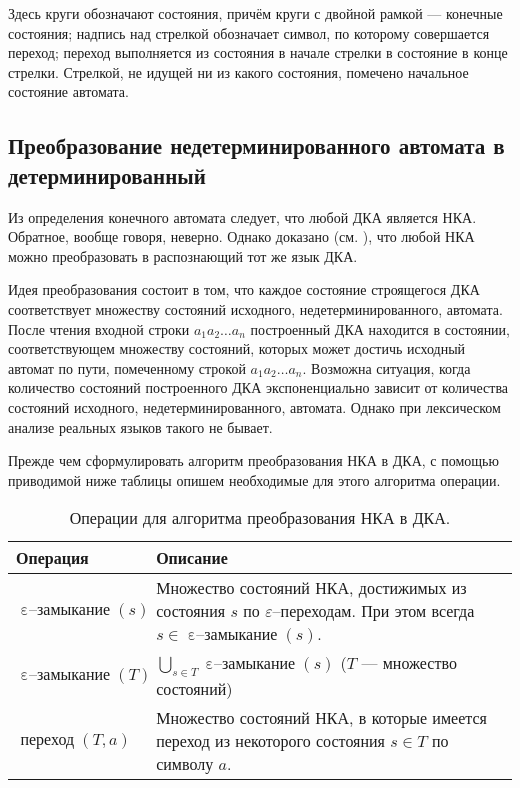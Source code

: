 \documentclass[10pt]{report}
\newcommand{\epsclos}{\mathop{\text{$\varepsilon$--замыкание}}}
\newcommand{\move}{\mathop{\text{переход}}}
\begin{document}
Здесь круги обозначают состояния, причём круги с двойной рамкой --- конечные состояния; надпись над стрелкой обозначает символ, по которому совершается переход;
переход выполняется из состояния в начале стрелки в состояние в конце стрелки. Стрелкой, не идущей ни из какого состояния, помечено начальное состояние автомата.

\subsection{Преобразование недетерминированного автомата в детерминированный}
Из определения конечного автомата следует, что любой ДКА является НКА. Обратное, вообще говоря, неверно. Однако доказано (см. \cite{AhoLamSetiUllman,HopkroftMotvaniUllman}),
что любой НКА можно преобразовать в распознающий тот же язык ДКА.

Идея преобразования состоит в том, что каждое состояние строящегося ДКА соответствует множеству состояний исходного, недетерминированного, автомата. После чтения входной
строки $a_1a_2\dots a_n$ построенный ДКА находится в состоянии, соответствующем множеству состояний, которых может достичь исходный автомат по пути, помеченному строкой
$a_1a_2\dots a_n$. Возможна ситуация, когда количество состояний построенного ДКА экспоненциально зависит от количества состояний исходного, недетерминированного, автомата.
Однако при лексическом анализе реальных языков такого не бывает.

Прежде чем сформулировать алгоритм преобразования НКА в ДКА, с помощью приводимой ниже таблицы опишем необходимые для этого алгоритма операции.
\begin{table}[!h]
\centering
\caption{Операции для алгоритма преобразования НКА в ДКА.}\label{Ops.for.conversion!table}
\vspace{1mm}
\begin{tabular}{|l|p{108mm}|}  \hline
Операция      & Описание \\  \hline
$\epsclos(s)$ & Множество состояний НКА, достижимых из состояния $s$ по $\varepsilon$--переходам. При этом всегда $s\in\epsclos(s)$.  \\  \hline
$\epsclos(T)$ & $\bigcup\limits_{s\in T}\epsclos(s)$ ($T$ --- множество состояний)                                                    \\  \hline
$\move(T,a)$  & Множество состояний НКА, в которые имеется переход из некоторого состояния $s\in T$ по символу $a$.                   \\  \hline
\end{tabular}
\end{table}
\end{document}
